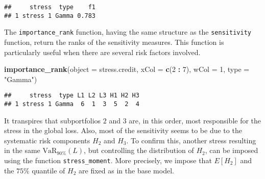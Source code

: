\documentclass[]{article}
\newenvironment{Shaded}{\begin{snugshade}}{\end{snugshade}}
\newcommand{\DataTypeTok}[1]{\textcolor[rgb]{0.13,0.29,0.53}{#1}}
\newcommand{\DecValTok}[1]{\textcolor[rgb]{0.00,0.00,0.81}{#1}}
\newcommand{\KeywordTok}[1]{\textcolor[rgb]{0.13,0.29,0.53}{\textbf{#1}}}
\newcommand{\NormalTok}[1]{#1}
\newcommand{\OperatorTok}[1]{\textcolor[rgb]{0.81,0.36,0.00}{\textbf{#1}}}
\newcommand{\StringTok}[1]{\textcolor[rgb]{0.31,0.60,0.02}{#1}}
\begin{document}
\begin{verbatim}
##     stress  type    f1
## 1 stress 1 Gamma 0.783
\end{verbatim}

The \texttt{importance\_rank} function, having the same structure as the \texttt{sensitivity} function, return the ranks of the sensitivity measures. This function is particularly useful when there are several risk factors involved.

\begin{Shaded}
\begin{Highlighting}[]
\KeywordTok{importance_rank}\NormalTok{(}\DataTypeTok{object =}\NormalTok{ stress.credit, }\DataTypeTok{xCol =} \KeywordTok{c}\NormalTok{(}\DecValTok{2} \OperatorTok{:}\StringTok{ }\DecValTok{7}\NormalTok{), }\DataTypeTok{wCol =} \DecValTok{1}\NormalTok{, }\DataTypeTok{type =} \StringTok{"Gamma"}\NormalTok{)  }
\end{Highlighting}
\end{Shaded}

\begin{verbatim}
##     stress  type L1 L2 L3 H1 H2 H3
## 1 stress 1 Gamma  6  1  3  5  2  4
\end{verbatim}

It transpires that subportfolios \(2\) and \(3\) are, in this order, most responsible for the stress in the global loss. Also, most of the sensitivity seems to be due to the systematic risk components \(H_2\) and \(H_3\). To confirm this, another stress resulting in the same \(\text{VaR}_{90\%}(L)\), but controlling the distribution of \(H_2\), can be imposed using the function \texttt{stress\_moment}. More precisely, we impose that \(E[H_2]\) and the \(75\%\) quantile of \(H_2\) are fixed as in the base model.
\end{document}
